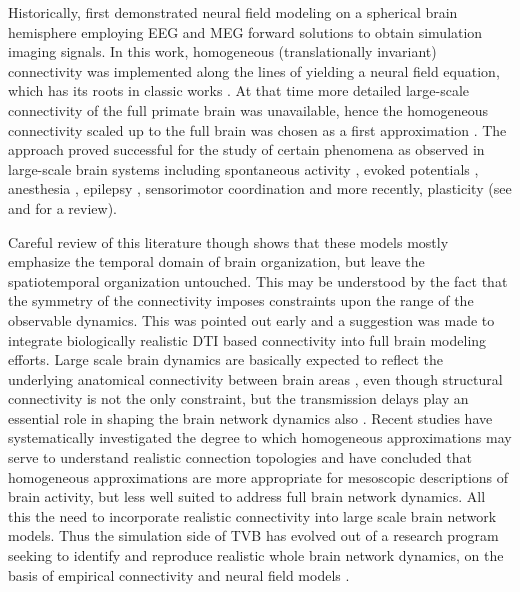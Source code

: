 \documentclass{bioinfo}
\begin{document}
    Historically, \citet{Jirsa_2002} first demonstrated neural field modeling on
    a spherical brain hemisphere employing EEG and MEG forward solutions to
    obtain simulation imaging signals. In this work, homogeneous
    (translationally invariant) connectivity was implemented along the lines of
    \citet{Jirsa_1996,Jirsa_1997, Bojak_2010} yielding a neural field equation,
    which has its roots in classic works
    \citep{Wilson_1972,Wilson_1973,Nunez_1974,Amari_1975, Amari_1977}. At that
    time more detailed large-scale connectivity of the full primate brain was
    unavailable, hence the homogeneous connectivity scaled up to the full brain
    was chosen as a first approximation \citep{Nunez_1974}. The approach proved
    successful for the study of certain phenomena as observed in large-scale
    brain systems including spontaneous  activity \citep{Breakspear_2003,
    Freyer_2011,Wright_1995,Rowe_2004,Robinson_2001, Robinson_2003}, evoked
    potentials \citep{Rennie_1999, Rennie_2002}, anesthesia \citep{Liley_2005},
    epilepsy \citep{Breakspear_2006}, sensorimotor coordination
    \citep{Jirsa_1996, Jirsa_1997} and more recently, plasticity \citep{Robinson_2011} (see \citet{Deco_2008a} and
    \citet{Jirsa_2004} for a review).
    
    Careful review of this literature though shows that these models mostly
    emphasize the temporal domain of brain organization, but leave the
    spatiotemporal organization untouched. This may be understood by the fact
    that the symmetry of the connectivity imposes constraints upon the range
    of the observable dynamics. This was pointed out early
    \citet{Jirsa_2002}
    and a suggestion was made to integrate biologically realistic DTI based
    connectivity into full brain modeling efforts. Large scale brain  dynamics
    are basically expected to reflect the underlying anatomical connectivity
    between brain areas \citep{Deco_2011, Bullmore_2009}, even though
    structural connectivity is not the only constraint, but the transmission
    delays play an essential role in  shaping the brain network dynamics also
    \citep{Jirsa_2000, Ghosh_2008, Knock_2009, Jirsa_2010b}. Recent studies
    \citep{Pinotsis_2012} have systematically investigated the degree to which
    homogeneous approximations may serve to understand realistic connection
    topologies and have concluded that homogeneous approximations are more
    appropriate for mesoscopic descriptions of brain activity, but less well
    suited to address full brain network dynamics. All this
     the need to incorporate realistic
    connectivity into large scale brain network models. Thus the simulation
    side of TVB has evolved out of a research program seeking to identify and
    reproduce realistic  whole brain network dynamics, on the basis of
    empirical connectivity and neural field  models \citep{Jirsa_2010,
    Deco_2011}.
\end{document}
